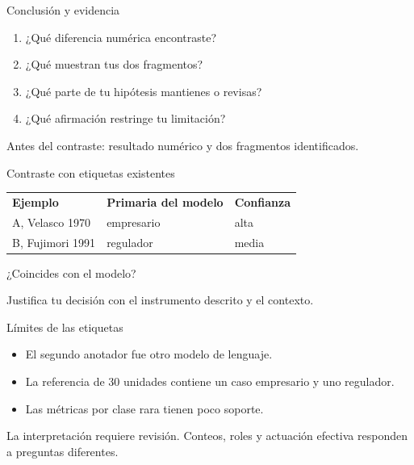 \begin{frame}[label=conclusion-provisional]{Conclusión y evidencia}
  \begin{enumerate}
    \item ¿Qué diferencia numérica encontraste?
    \item ¿Qué muestran tus dos fragmentos?
    \item ¿Qué parte de tu hipótesis mantienes o revisas?
    \item ¿Qué afirmación restringe tu limitación?
  \end{enumerate}
  \par\vspace{0.3cm}
  Antes del contraste: resultado numérico y dos fragmentos identificados.
\end{frame}

\begin{frame}[label=etiquetas]{Contraste con etiquetas existentes}
  \renewcommand{\arraystretch}{1.4}
  \begin{tabular}{@{}lll@{}}
    \textbf{Ejemplo} & \textbf{Primaria del modelo} & \textbf{Confianza}\\
    A, Velasco 1970 & empresario & alta\\
    B, Fujimori 1991 & regulador & media\\
  \end{tabular}\par
  \par\vspace{0.4cm}
  ¿Coincides con el modelo?\par
  Justifica tu decisión con el instrumento descrito y el contexto.
\end{frame}

\begin{frame}[label=limites]{Límites de las etiquetas}
  \begin{itemize}
    \item El segundo anotador fue otro modelo de lenguaje.
    \item La referencia de 30 unidades contiene un caso empresario y uno regulador.
    \item Las métricas por clase rara tienen poco soporte.
  \end{itemize}
  \par\vspace{0.3cm}
  La interpretación requiere revisión. Conteos, roles y actuación efectiva responden a preguntas diferentes.
\end{frame}

